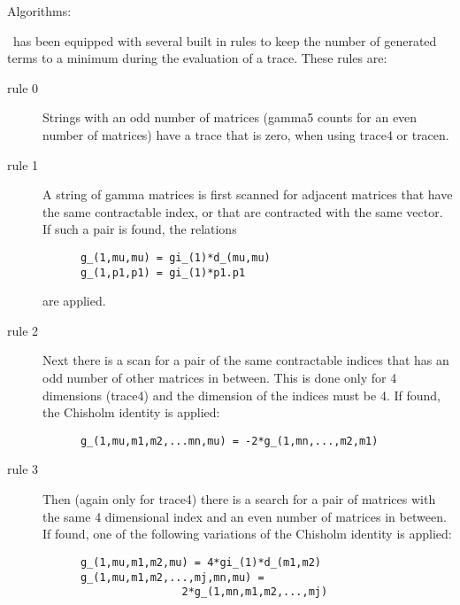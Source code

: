 \vspace{3mm}

\noindent Algorithms:

\FORM\ has been equipped with several built in rules to keep the 
number of generated terms to a minimum during the evaluation of a 
trace. These rules are:

\begin{description}
\item [rule 0]
    Strings with an odd number of matrices (gamma5 counts for an even number 
    of matrices) have a trace that is zero, when using trace4 or tracen.
\item [rule 1]
    A string of gamma matrices is first scanned for adjacent 
matrices that have the same contractable index, or that are contracted with 
the same vector. If such a pair is found, the relations
\begin{verbatim}
      g_(1,mu,mu) = gi_(1)*d_(mu,mu)
      g_(1,p1,p1) = gi_(1)*p1.p1
\end{verbatim}
\noindent are applied.
\item [rule 2]
   Next there is a scan for a pair of the same contractable 
indices that has an odd number of other matrices in between. This is done 
only for 4 dimensions (trace4) and the dimension of the indices must be 4. 
If found, the Chisholm identity is applied:
\begin{verbatim}
      g_(1,mu,m1,m2,...mn,mu) = -2*g_(1,mn,...,m2,m1)
\end{verbatim}
\item [rule 3]
  Then (again only for trace4) there is a search for a pair 
of matrices with the same 4 dimensional index and an even number of 
matrices in between. If found, one of the following variations of the 
Chisholm identity is applied:
\begin{verbatim}
      g_(1,mu,m1,m2,mu) = 4*gi_(1)*d_(m1,m2)
      g_(1,mu,m1,m2,...,mj,mn,mu) =
                      2*g_(1,mn,m1,m2,...,mj)

\end{verbatim}
\end{description}
